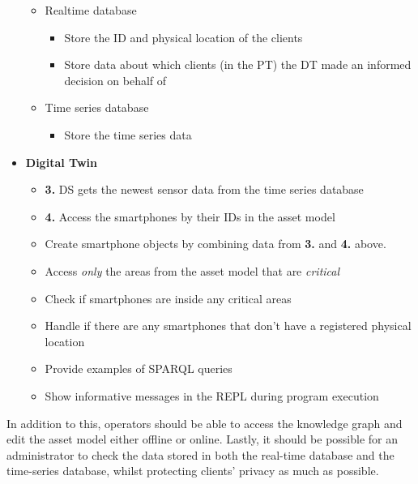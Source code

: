 \documentclass{article}
\begin{document}
\begin{itemize}
    \begin{itemize}
        \item Realtime database
        \begin{itemize}
            \item Store the ID and physical location of the clients
            \item Store data about which clients (in the PT) the DT made an informed decision on behalf of
        \end{itemize}
        \item Time series database
        \begin{itemize}
            \item Store the time series data
        \end{itemize}
    \end{itemize}
    \item \textbf{Digital Twin}
    \begin{itemize} 
        \item \textbf{3.} DS gets the newest sensor data from the time series database
        \item \textbf{4.} Access the smartphones by their IDs in the asset model
        \item Create smartphone objects by combining data from \textbf{3.} and \textbf{4.} above. 
        \item Access \emph{only} the areas from the asset model that are \emph{critical}
        \item Check if smartphones are inside any critical areas
        \item Handle if there are any smartphones that don't have a registered physical location
        \item Provide examples of SPARQL queries
        \item Show informative messages in the REPL during program execution
    \end{itemize}
\end{itemize}

In addition to this, operators should be able to access the knowledge graph and edit the asset model either offline or online. Lastly, it should be possible for an administrator to check the data stored in both the real-time database and the time-series database, whilst protecting clients' privacy as much as possible.
\end{document}
